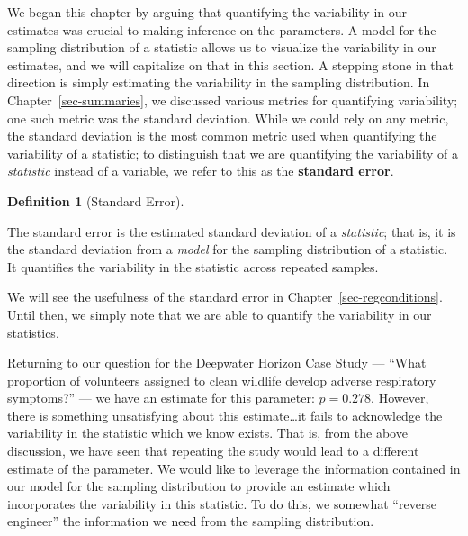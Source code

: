 \documentclass[
  letterpaper,
  DIV=11,
  numbers=noendperiod]{scrreprt}
\theoremstyle{plain}
\theoremstyle{definition}
\theoremstyle{definition}
\newtheorem{definition}{Definition}[chapter]
\theoremstyle{remark}
\begin{document}
We began this chapter by arguing that quantifying the variability in our
estimates was crucial to making inference on the parameters. A model for
the sampling distribution of a statistic allows us to visualize the
variability in our estimates, and we will capitalize on that in this
section. A stepping stone in that direction is simply estimating the
variability in the sampling distribution. In
Chapter~\ref{sec-summaries}, we discussed various metrics for
quantifying variability; one such metric was the standard deviation.
While we could rely on any metric, the standard deviation is the most
common metric used when quantifying the variability of a statistic; to
distinguish that we are quantifying the variability of a
\emph{statistic} instead of a variable, we refer to this as the
\textbf{standard error}.

\begin{definition}[Standard
Error]\protect\hypertarget{def-standard-error}{}\label{def-standard-error}

The standard error is the estimated standard deviation of a
\emph{statistic}; that is, it is the standard deviation from a
\emph{model} for the sampling distribution of a statistic. It quantifies
the variability in the statistic across repeated samples.

\end{definition}

We will see the usefulness of the standard error in
Chapter~\ref{sec-regconditions}. Until then, we simply note that we are
able to quantify the variability in our statistics.

Returning to our question for the Deepwater Horizon Case Study ---
``What proportion of volunteers assigned to clean wildlife develop
adverse respiratory symptoms?'' --- we have an estimate for this
parameter: \(\widehat{p} = 0.278\). However, there is something
unsatisfying about this estimate\ldots it fails to acknowledge the
variability in the statistic which we know exists. That is, from the
above discussion, we have seen that repeating the study would lead to a
different estimate of the parameter. We would like to leverage the
information contained in our model for the sampling distribution to
provide an estimate which incorporates the variability in this
statistic. To do this, we somewhat ``reverse engineer'' the information
we need from the sampling distribution.
\end{document}
